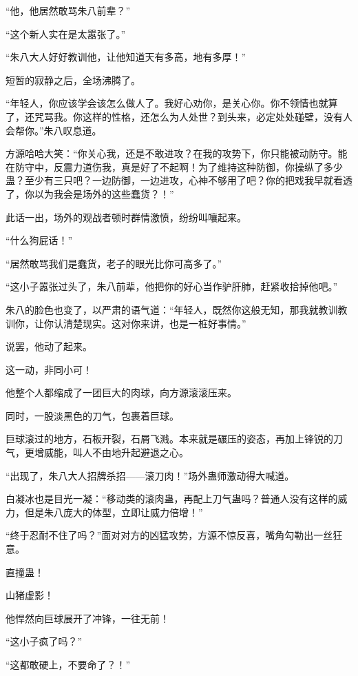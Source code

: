 
\begin{this_body}

“他，他居然敢骂朱八前辈？”

“这个新人实在是太嚣张了。”

“朱八大人好好教训他，让他知道天有多高，地有多厚！”

短暂的寂静之后，全场沸腾了。

“年轻人，你应该学会该怎么做人了。我好心劝你，是关心你。你不领情也就算了，还咒骂我。你这样的性格，还怎么为人处世？到头来，必定处处碰壁，没有人会帮你。”朱八叹息道。

方源哈哈大笑：“你关心我，还是不敢进攻？在我的攻势下，你只能被动防守。能在防守中，反震力道伤我，真是好了不起啊！为了维持这种防御，你操纵了多少蛊？至少有三只吧？一边防御，一边进攻，心神不够用了吧？你的把戏我早就看透了，你以为我会是场外的这些蠢货？！”

此话一出，场外的观战者顿时群情激愤，纷纷叫嚷起来。

“什么狗屁话！”

“居然敢骂我们是蠢货，老子的眼光比你可高多了。”

“这小子嚣张过头了，朱八前辈，他把你的好心当作驴肝肺，赶紧收拾掉他吧。”

朱八的脸色也变了，以严肃的语气道：“年轻人，既然你这般无知，那我就教训教训你，让你认清楚现实。这对你来讲，也是一桩好事情。”

说罢，他动了起来。

这一动，非同小可！

他整个人都缩成了一团巨大的肉球，向方源滚滚压来。

同时，一股淡黑色的刀气，包裹着巨球。

巨球滚过的地方，石板开裂，石屑飞溅。本来就是碾压的姿态，再加上锋锐的刀气，更增威能，叫人不由地升起避退之心。

“出现了，朱八大人招牌杀招——滚刀肉！”场外蛊师激动得大喊道。

白凝冰也是目光一凝：“移动类的滚肉蛊，再配上刀气蛊吗？普通人没有这样的威力，但是朱八庞大的体型，立即让威力倍增！”

“终于忍耐不住了吗？”面对对方的凶猛攻势，方源不惊反喜，嘴角勾勒出一丝狂意。

直撞蛊！

山猪虚影！

他悍然向巨球展开了冲锋，一往无前！

“这小子疯了吗？”

“这都敢硬上，不要命了？！”


\end{this_body}
